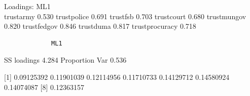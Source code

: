 \documentclass[
  letterpaper,
  DIV=11,
  numbers=noendperiod]{scrartcl}
\newenvironment{Shaded}{\begin{snugshade}}{\end{snugshade}}
\newcommand{\FunctionTok}[1]{\textcolor[rgb]{0.28,0.35,0.67}{#1}}
\newcommand{\NormalTok}[1]{\textcolor[rgb]{0.00,0.23,0.31}{#1}}
\newcommand{\OtherTok}[1]{\textcolor[rgb]{0.00,0.23,0.31}{#1}}
\newcommand{\SpecialCharTok}[1]{\textcolor[rgb]{0.37,0.37,0.37}{#1}}
\begin{document}
Loadings: ML1\\
trustarmy 0.530 trustpolice 0.691 trustfsb 0.703 trustcourt 0.680
trustmungov 0.820 trustfedgov 0.846 trustduma 0.817 trustprocuracy 0.718

\begin{verbatim}
             ML1
\end{verbatim}

SS loadings 4.284 Proportion Var 0.536

\begin{Shaded}
\end{Shaded}

{[}1{]} 0.09125392 0.11901039 0.12114956 0.11710733 0.14129712
0.14580924 0.14074087 {[}8{]} 0.12363157
\end{document}
